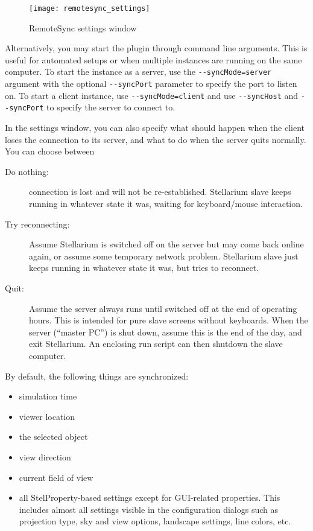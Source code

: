 \begin{figure}[h]
	\centering\texttt{[image: remotesync\_settings]}
	\caption{RemoteSync settings window}
	\label{fig:plugins:RemoteSync:settings}
\end{figure}

Alternatively, you may start the plugin through command line arguments. This is
useful for automated setups or when multiple instances are running on the same
computer. To start the instance as a server, use the
\texttt{-{}-syncMode=server} argument with the optional \texttt{-{}-syncPort}
parameter to specify the port to listen on. To start a client instance, use
\texttt{-{}-syncMode=client} and use \texttt{-{}-syncHost} and
\texttt{-{}-syncPort} to specify the server to connect to.

In the settings window, you can also specify what should happen when the client 
loses the connection to its server, and what to do when the server quits 
normally. You can choose between 
\begin{description}
\item[Do nothing:] connection is lost and will not be re-established. Stellarium slave keeps running 
     in whatever state it was, waiting for keyboard/mouse interaction. 
\item[Try reconnecting:] Assume Stellarium is switched off on the server
      but may come back online again, or assume some temporary network problem. 
	  Stellarium slave just keeps running in whatever state it was, but tries to reconnect.
\item[Quit:] Assume the server always runs until switched off at the end of operating hours. 
      This is intended for pure slave screens without keyboards. When the server (``master PC'') 
	  is shut down, assume this is the end of the day, and exit Stellarium. An enclosing run script 
	  can then shutdown the slave computer. 
\end{description}
By default, the following things are synchronized:
\begin{itemize}
	\item simulation time
	\item viewer location
	\item the selected object
	\item view direction
	\item current field of view
	\item all StelProperty-based settings except for GUI-related properties. 
	This includes almost all settings visible in the configuration dialogs such 
	as projection type, sky and view options, landscape settings, line colors, etc.
\end{itemize}


